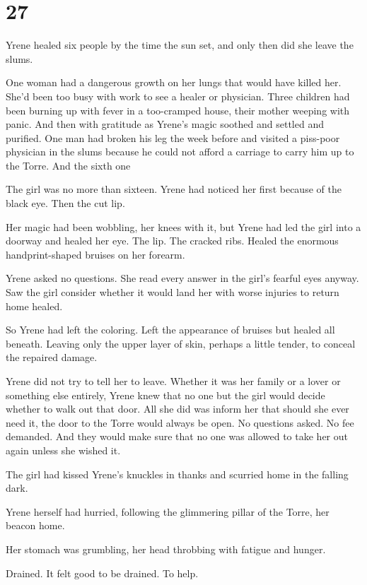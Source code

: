 
\chapter{27}

Yrene healed six people by the time the sun set, and only then did she leave the slums.

One woman had a dangerous growth on her lungs that would have killed her. She'd been too busy with work to see a healer or physician. Three children had been burning up with fever in a too-cramped house, their mother weeping with panic. And then with gratitude as Yrene's magic soothed and settled and purified. One man had broken his leg the week before and visited a piss-poor physician in the slums because he could not afford a carriage to carry him up to the Torre. And the sixth one


The girl was no more than sixteen. Yrene had noticed her first because of the black eye. Then the cut lip.

Her magic had been wobbling, her knees with it, but Yrene had led the girl into a doorway and healed her eye. The lip. The cracked ribs. Healed the enormous handprint-shaped bruises on her forearm.

Yrene asked no questions. She read every answer in the girl's fearful eyes anyway. Saw the girl consider whether it would land her with worse injuries to return home healed.

So Yrene had left the coloring. Left the appearance of bruises but healed all beneath. Leaving only the upper layer of skin, perhaps a little tender, to conceal the repaired damage.

Yrene did not try to tell her to leave. Whether it was her family or a lover or something else entirely, Yrene knew that no one but the girl would decide whether to walk out that door. All she did was inform her that should she ever need it, the door to the Torre would always be open. No questions asked. No fee demanded. And they would make sure that no one was allowed to take her out again unless she wished it.

The girl had kissed Yrene's knuckles in thanks and scurried home in the falling dark.

Yrene herself had hurried, following the glimmering pillar of the Torre, her beacon home.

Her stomach was grumbling, her head throbbing with fatigue and hunger.

Drained. It felt good to be drained. To help.

